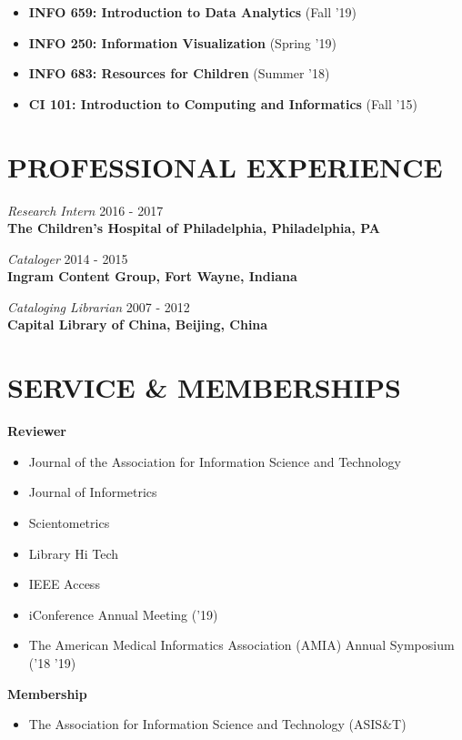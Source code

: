 \documentclass[margin, 10pt]{res} %
\begin{document}
\begin{resume}
\begin{itemize}
\item \textbf{INFO 659: Introduction to Data Analytics} (Fall '19)
\item \textbf{INFO 250: Information Visualization} (Spring '19)
\item \textbf{INFO 683: Resources for Children} (Summer '18)
\item \textbf{CI 101: Introduction to Computing and Informatics} (Fall '15)
\end{itemize}

\section{PROFESSIONAL EXPERIENCE}

\textit{Research Intern} \hfill 2016 - 2017\\
\textbf{The Children’s Hospital of Philadelphia, Philadelphia, PA}

\textit{Cataloger} \hfill 2014 - 2015\\
\textbf{Ingram Content Group, Fort Wayne, Indiana}

\textit{Cataloging Librarian} \hfill 2007 - 2012\\
\textbf{Capital Library of China, Beijing, China}

\section{SERVICE \& MEMBERSHIPS}

\textbf{Reviewer}
\begin{itemize}
\item Journal of the Association for Information Science and Technology
\item Journal of Informetrics
\item Scientometrics
\item Library Hi Tech
\item IEEE Access
\item iConference Annual Meeting ('19)
\item The American Medical Informatics Association (AMIA) Annual Symposium ('18 '19)
\end{itemize}

\textbf{Membership}
\begin{itemize}
\item The Association for Information Science and Technology (ASIS\&T)
\end{itemize}


\end{resume}
\end{document}
